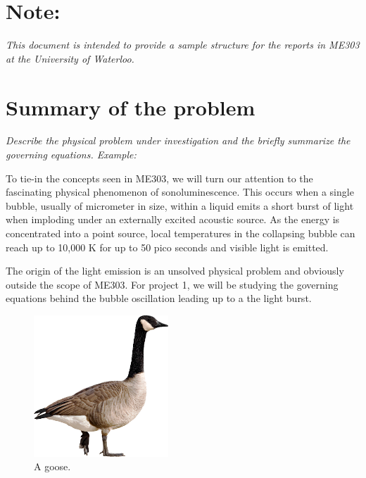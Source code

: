 \documentclass[12pt,twoside,letterpaper]{article}
\begin{document}




\section*{Note:}
\emph{This document is intended to provide a sample structure for the reports in ME303 at the University of Waterloo. }

\section{Summary of the problem}
\emph{Describe the physical problem under investigation and the briefly summarize the governing equations. Example:}

To tie-in the concepts seen in ME303, we will turn our attention to the fascinating physical phenomenon of sonoluminescence. This occurs when a single bubble, usually of micrometer in size, within a liquid emits a short burst of light when imploding under an externally excited acoustic source. As the energy is concentrated into a point source, local temperatures in the collapsing bubble can reach up to 10,000 K for up to 50 pico seconds and visible light is emitted.

The origin of the light emission is an unsolved physical problem and obviously outside the scope of ME303. For project 1, we will be studying the governing equations behind the bubble oscillation leading up to a the light burst.
\begin{figure}[h!]
\centering
\includegraphics[width=0.45\textwidth]{figures/goose.png} 
\caption{A goose.}
\label{goose}
\end{figure}
\end{document}
